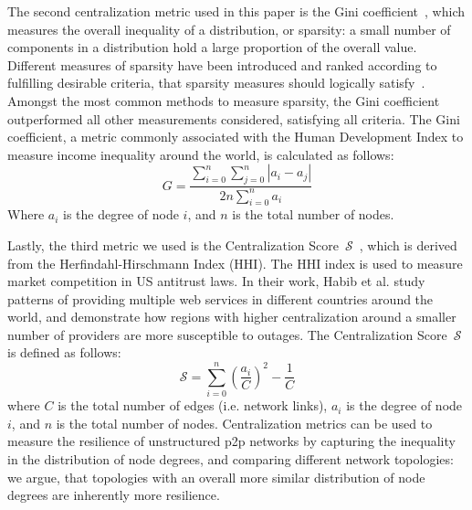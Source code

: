 The second centralization metric used in this paper is the Gini coefficient~\cite{sparsity}, which measures the overall inequality of a distribution, or sparsity: a small number of components in a distribution hold a large proportion of the overall value.
Different measures of sparsity have been introduced and ranked according to fulfilling desirable criteria, that sparsity measures should logically satisfy~\cite{sparsity}.%
Amongst the most common methods to measure sparsity, the Gini coefficient outperformed all other measurements considered, satisfying all criteria.
The Gini coefficient, a metric commonly associated with the Human Development Index to measure income inequality around the world, is calculated as follows:
\[
G = \frac{\sum_{i=0}^n \sum_{j=0}^n |a_i - a_j|}{2n \sum_{i=0}^n a_i}
\]
Where $a_i$ is the degree of node $i$, and $n$ is the total number of nodes.

Lastly, the third metric we used is the  Centralization Score~$\mathscr{S}$~\cite{dependence}, which is derived from the Herfindahl-Hirschmann Index (HHI). The HHI index is used to measure market competition in US antitrust laws.
In their work, Habib et al. study patterns of providing multiple web services in different countries around the world, and demonstrate how regions with higher centralization around a smaller number of providers are more susceptible to outages.
The Centralization Score~$\mathscr{S}$ is defined as follows:
\[
\mathscr{S} = \sum_{i=0}^n (\frac{a_i}{C})^2 - \frac{1}{C}
\]
where $C$ is the total number of edges (i.e. network links), $a_i$ is the degree of node $i$, and $n$ is the total number of nodes.
Centralization metrics can be used to measure the resilience of unstructured p2p networks by capturing the inequality in the distribution of node degrees, and comparing different network topologies: we argue, that topologies with an overall more similar distribution of node degrees are inherently more resilience.